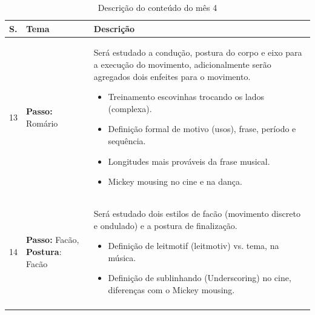 \documentclass[12pt, a4paper]{article}
\begin{document}
\begin{longtable}{|p{0.5cm}|p{3.0cm}|p{12.0cm}|}
\hline
S. & Tema & Descrição \\  \hline \hline
13&  \textbf{Passo:} Romário & Será estudado a condução, postura do corpo e eixo para a execução do movimento, adicionalmente serão agregados dois enfeites para o movimento.
        \begin{itemize}
        \item Treinamento escovinhas trocando os lados (complexa).
        \item Definição formal de motivo (usos), frase, período e sequência.
        \item Longitudes mais prováveis da frase musical.
        \item Mickey mousing no cine e na dança.
        \end{itemize}
        \\ \hline
14&  \textbf{Passo:} Facão, \textbf{Postura}: Facão & Será estudado dois estilos de facão (movimento discreto e ondulado) e a postura de finalização. 
        \begin{itemize}
        \item Definição de leitmotif (leitmotiv) vs. tema, na música.
        \item Definição de sublinhando (Underscoring) no cine, diferenças com o Mickey mousing.
        \end{itemize}
        \\ \hline
\caption{Descrição do conteúdo do mês 4}
\label{tab:myfirsttable4}
\end{longtable}
\end{document}
